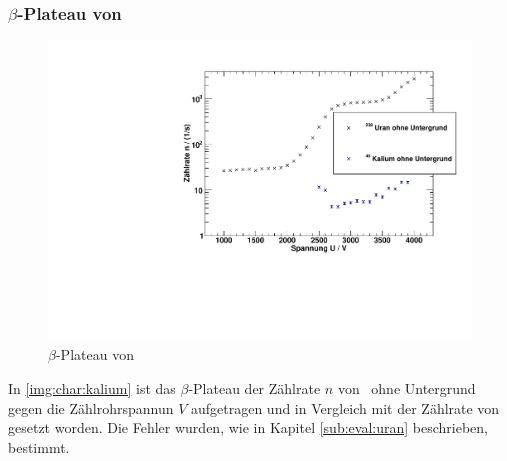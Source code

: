 \subsubsection{$\beta$-Plateau von \kalium}
\begin{figure}[H]
\begin{center}
  \includegraphics[width=15cm]{../img/Kalium40_Charakteristik.pdf}
  \caption[$\beta$-Plateau mit \samarium]{$\beta$-Plateau von \kalium}
  \label{img:char:kalium}
\end{center}
\end{figure}
In \autoref{img:char:kalium} ist das $\beta$-Plateau der Zählrate $n$ von \kalium\, ohne Untergrund gegen die Zählrohrspannun $V$ aufgetragen 
und in Vergleich mit der Zählrate von \uran\, gesetzt worden. Die Fehler wurden, wie in Kapitel \ref{sub:eval:uran} beschrieben, bestimmt.

